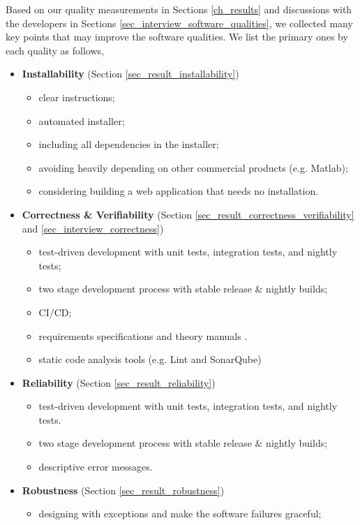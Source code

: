 \documentclass[3p, 12pt,authoryear]{elsarticle}
\begin{document}
Based on our quality measurements in Sections \ref{ch_results} and discussions
with the developers in Sections \ref{sec_interview_software_qualities}, we
collected many key points that may improve the software qualities. We list the
primary ones by each quality as follows,
\begin{itemize}
\item \textbf{Installability} (Section \ref{sec_result_installability})
\begin{itemize}
    \item clear instructions;
    \item automated installer;
    \item including all dependencies in the installer;
    \item avoiding heavily depending on other commercial products (e.g. Matlab);
    \item considering building a web application that needs no installation.
\end{itemize}
\item \textbf{Correctness \& Verifiability} (Section \ref{sec_result_correctness_verifiability} and \ref{sec_interview_correctness})
\begin{itemize}
    \item test-driven development with unit tests, integration tests, and nightly tests;
    \item two stage development process with stable release \& nightly builds;
    \item CI/CD;
    \item requirements specifications and theory manuals \citep{Smith2016} \citep{SmithAndLai2005}.
    \item static code analysis tools (e.g. Lint and SonarQube)
\end{itemize}
\item \textbf{Reliability} (Section \ref{sec_result_reliability})
\begin{itemize}
    \item test-driven development with unit tests, integration tests, and nightly tests.
    \item two stage development process with stable release \& nightly builds;
    \item descriptive error messages.
\end{itemize}
\item \textbf{Robustness} (Section \ref{sec_result_robustness})
\begin{itemize}
    \item designing with exceptions and make the software failures graceful;

\end{itemize}
\end{itemize}
\end{document}
